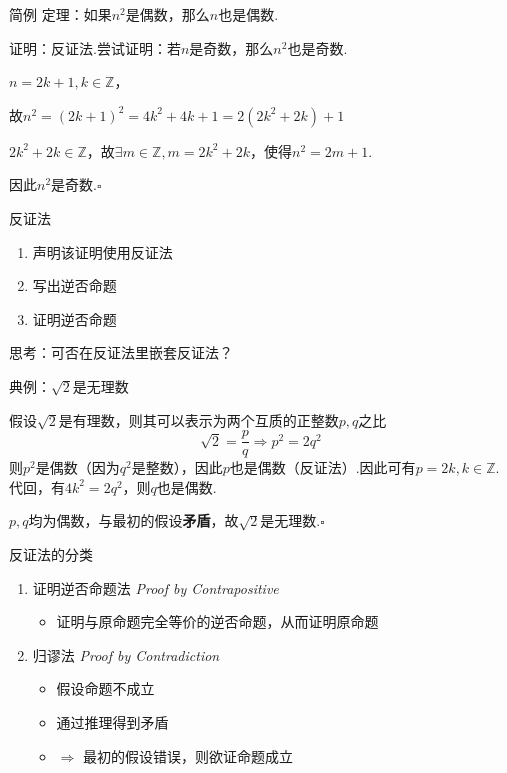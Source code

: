 \documentclass[]{beamer}
\begin{document}
\begin{frame}{简例}
    定理：如果$n^2$是偶数，那么$n$也是偶数.
    
    证明：反证法.尝试证明：若$n$是奇数，那么$n^2$也是奇数.

    \hspace{3em} $n=2k+1,k\in \mathbb{Z}$，
    
    \hspace{3em} 故$n^2=(2k+1)^2= 4k^2+4k+1=2(2k^2+2k)+1$

    \hspace{3em} $2k^2+2k\in\mathbb{Z}$，故$\exists m\in\mathbb{Z}, m=2k^2+2k$，使得$n^2=2m+1$.

    \hspace{3em} 因此$n^2$是奇数.$\square$
    
\end{frame}

\begin{frame}{反证法}
    \begin{enumerate}
        \item 声明该证明使用反证法
        \item 写出逆否命题
        \item 证明逆否命题
    \end{enumerate}
    思考：可否在反证法里嵌套反证法？
\end{frame}

\begin{frame}{典例：$\sqrt{2}$是无理数}

假设$\sqrt{2}$是有理数，则其可以表示为两个互质的正整数$p,q$之比
        \[
        \sqrt{2}=\frac{p}{q} \Rightarrow p^2=2q^2
        \]
则$p^2$是偶数（因为$q^2$是整数），因此$p$也是偶数（反证法）.因此可有$p=2k, k\in\mathbb{Z}$. 代回，有$4k^2=2q^2$，则$q$也是偶数.

$p,q$均为偶数，与最初的假设\textbf{矛盾}，故$\sqrt{2}$是无理数.$\square$
  
\end{frame}

\begin{frame}{反证法的分类}
    \begin{enumerate}
        \item 证明逆否命题法 \textit{Proof by Contrapositive}
        \begin{itemize}
            \item 证明与原命题完全等价的逆否命题，从而证明原命题
        \end{itemize}
        \item 归谬法 \textit{Proof by Contradiction}
        \begin{itemize}
            \item 假设命题不成立
            \item 通过推理得到矛盾
            \item $\Rightarrow$ 最初的假设错误，则欲证命题成立
        \end{itemize}
    \end{enumerate}
\end{frame}
\end{document}

